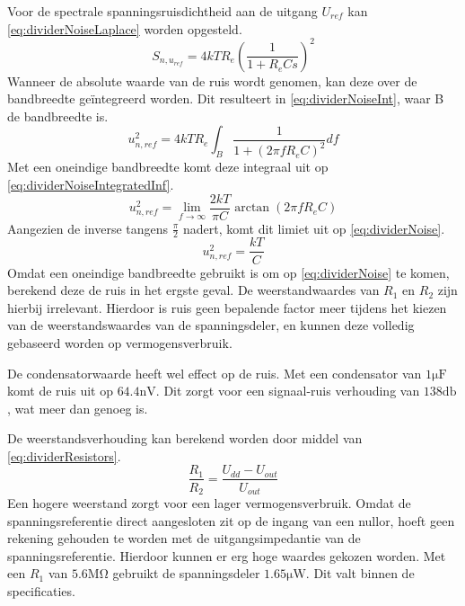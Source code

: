 \noindent
Voor de spectrale spanningsruisdichtheid aan de uitgang $U_{ref}$ kan \autoref{eq:dividerNoiseLaplace} worden opgesteld.
\begin{equation}\label{eq:dividerNoiseLaplace}
    S_{n,u_{ref}} = 4kTR_e\left(\frac{1}{1 + R_eCs}\right)^2
\end{equation}
Wanneer de absolute waarde van de ruis wordt genomen, kan deze over de bandbreedte geïntegreerd worden. Dit resulteert in \autoref{eq:dividerNoiseInt}, waar B de bandbreedte is.
\begin{equation}\label{eq:dividerNoiseInt}
    u_{n,ref}^2 = 4kTR_e\int_{B} \frac{1}{1 + (2\pi f R_e C)^2} df
\end{equation}
Met een oneindige bandbreedte komt deze integraal uit op \autoref{eq:dividerNoiseIntegratedInf}.
\begin{equation}\label{eq:dividerNoiseIntegratedInf}
    u_{n,ref}^2 = \lim_{f\rightarrow\infty}\frac{2kT}{\pi C} \arctan(2\pi f R_eC)
\end{equation}
Aangezien de inverse tangens $\frac{\pi}{2}$ nadert, komt dit limiet uit op \autoref{eq:dividerNoise}.
\begin{equation}\label{eq:dividerNoise}
    u_{n,ref}^2 = \frac{kT}{C}
\end{equation}
Omdat een oneindige bandbreedte gebruikt is om op \autoref{eq:dividerNoise} te komen, berekend deze de ruis in het ergste geval. De weerstandwaardes van $R_1$ en $R_2$ zijn hierbij irrelevant. Hierdoor is ruis geen bepalende factor meer tijdens het kiezen van de weerstandswaardes van de spanningsdeler, en kunnen deze volledig gebaseerd worden op vermogensverbruik.

De condensatorwaarde heeft wel effect op de ruis. Met een condensator van $1\si{\micro\farad}$ komt de ruis uit op $64.4\si{\nano\volt}$. Dit zorgt voor een signaal-ruis verhouding van $138\si{\decibel}$, wat meer dan genoeg is.

De weerstandsverhouding kan berekend worden door middel van \autoref{eq:dividerResistors}.
\begin{equation}\label{eq:dividerResistors}
    \frac{R_1}{R_2} = \frac{U_{dd}-U_{out}}{U_{out}}
\end{equation}
Een hogere weerstand zorgt voor een lager vermogensverbruik. Omdat de spanningsreferentie direct aangesloten zit op de ingang van een nullor, hoeft geen rekening gehouden te worden met de uitgangsimpedantie van de spanningsreferentie. Hierdoor kunnen er erg hoge waardes gekozen worden. Met een $R_1$ van $5.6\si{\mega\ohm}$ gebruikt de spanningsdeler $1.65\si{\micro\watt}$. Dit valt binnen de specificaties.

